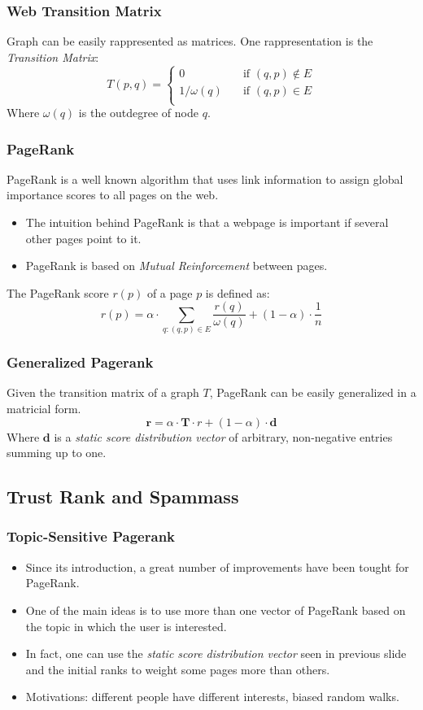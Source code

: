 \documentclass{beamer}
\newcommand{\vect}[1]{\ensuremath{\boldsymbol{#1}}}
\begin{document}
\begin{frame}
\frametitle{Web Transition Matrix}
Graph can be easily rappresented as matrices. 
\vfill
One rappresentation is the \emph{Transition Matrix}:
\[ T(p,q) =
\begin{cases}
	0       & \quad \text{if } (q,p) \notin E\\
	1/\omega(q)  & \quad \text{if } (q,p) \in E\\
\end{cases}
\]
\vfill
Where $\omega(q)$ is the outdegree of node $q$.
\end{frame}

\begin{frame}
\frametitle{PageRank}
PageRank is a well known algorithm that uses link information to assign global importance scores to all pages on the web. 
\begin{itemize}
\item The intuition behind PageRank is that a webpage is important if several other pages point to it.
\item PageRank is based on \emph{Mutual Reinforcement} between pages.
\end{itemize}
\vfill
The PageRank score $r(p)$ of a page $p$ is defined as:
$$ r(p) = \alpha \cdot \displaystyle\sum_{q:(q,p) \in E} \frac{r(q)}{\omega(q)} + (1 - \alpha) \cdot \frac{1}{n} $$
\end{frame}

\begin{frame}
\frametitle{Generalized Pagerank}
Given the transition matrix of a graph $T$, PageRank can be easily generalized in a matricial form.
$$\vect{r} = \alpha \cdot \vect{T} \cdot r + (1 - \alpha) \cdot \vect{d}$$
Where $\vect{d}$ is a \emph{static score distribution vector} of arbitrary, non-negative entries summing up to one.
\end{frame}

\subsection{Trust Rank and Spammass}
\begin{frame}
\frametitle{Topic-Sensitive Pagerank}
\begin{itemize}
\item Since its introduction, a great number of improvements have been tought for PageRank.
\item One of the main ideas is to use more than one vector of PageRank based on the \alert{topic} in which the user is interested.
\item In fact, one can use the \emph{static score distribution vector} seen in previous slide and the initial ranks to weight some pages more than others.
\item Motivations: different people have different interests, biased random walks.
\end{itemize}
\end{frame}
\end{document}
